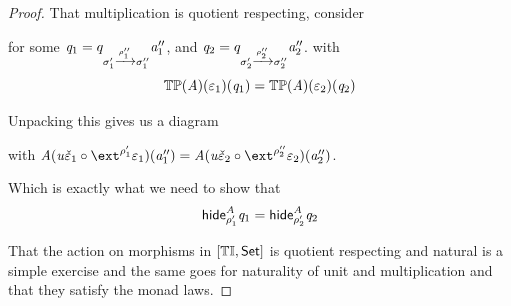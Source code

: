 \begin{proof}
    That multiplication is quotient respecting, consider
    for some $\mathit{q}_1 = q_{\sigma_1' \xrightarrow{\rho_1''} \sigma_1''} \mathit{a}_1''$, and  
    $\mathit{q}_2 = q_{\sigma_2' \xrightarrow{\rho_2''} \sigma_2''} \mathit{a}_2''$.
    with
    \[ {\mathbb{T}{\mathbb{P}}}(\mathit{A})(\varepsilon_1)(\mathit{q}_1) = {\mathbb{T}{\mathbb{P}}}(\mathit{A})(\varepsilon_2)(\mathit{q}_2) \]

    Unpacking this gives us a diagram
    \begin{center}
    \end{center}
with $\vA(\tinstU\check\me_1 \comp \ext^{\rho_1'}\me_1)(\va_1'') = \vA(\tinstU\check\me_2 \comp \ext^{\rho_2''}\me_2)(\va_2'')$. 

    Which is exactly what we need to show that 
    \[ \mathsf{hide}^{\mathit{A}}_{\rho_1'}\mathit{q}_1 = \mathsf{hide}^{\mathit{A}}_{\rho_2'}\mathit{q}_2 \]

    That the action on morphisms in $[{\mathbb{T}\mathbb{I}}, \mathsf{Set}]$ is quotient respecting and natural is a simple exercise
    and the same goes for naturality of unit and multiplication and that they satisfy the monad laws.
\end{proof}

